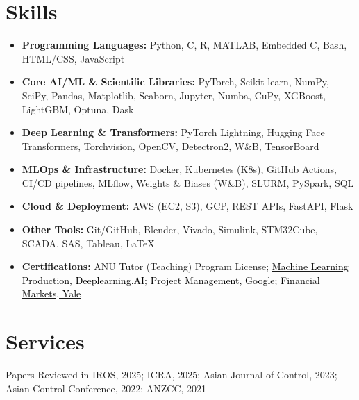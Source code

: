 \documentclass[10pt, a4paper, sans]{moderncv}
\begin{document}
%
%
%
\section*{Skills}
\begin{itemize}[leftmargin=*, itemsep=0em]
    \item \textbf{Programming Languages:} Python, C, R, MATLAB, Embedded C, Bash, HTML/CSS, JavaScript
    \item \textbf{Core AI/ML \& Scientific Libraries:} PyTorch, Scikit-learn, NumPy, SciPy, Pandas, Matplotlib, Seaborn, Jupyter, Numba, CuPy, XGBoost, LightGBM, Optuna, Dask
    \item \textbf{Deep Learning \& Transformers:} PyTorch Lightning, Hugging Face Transformers, Torchvision, OpenCV, Detectron2, W\&B, TensorBoard
    \item \textbf{MLOps \& Infrastructure:} Docker, Kubernetes (K8s), GitHub Actions, CI/CD pipelines, MLflow, Weights \& Biases (W\&B), SLURM, PySpark, SQL
    \item \textbf{Cloud \& Deployment:} AWS (EC2, S3), GCP, REST APIs, FastAPI, Flask
    \item \textbf{Other Tools:} Git/GitHub, Blender, Vivado, Simulink, STM32Cube, SCADA, SAS, Tableau, \LaTeX
    \item \textbf{Certifications:} ANU Tutor (Teaching) Program License; \href{https://coursera.org/share/8204c8b2ca3d84b7fccec7d44edaa8b7}{\textcolor{black}{Machine Learning Production, Deeplearning.AI}}; \href{https://www.coursera.org/account/accomplishments/certificate/JZCYF4MAB3CX}{\textcolor{black}{Project Management, Google}}; \href{https://www.coursera.org/account/accomplishments/verify/X6R6DZN8VGXN?utm_source=link&utm_medium=certificate&utm_content=cert_image&utm_campaign=pdf_header_button&utm_product=course}{\textcolor{black}{Financial Markets, Yale}}
\end{itemize}
\vspace{-1em}
\section*{Services}
Papers Reviewed in IROS, 2025; ICRA, 2025; Asian Journal of Control, 2023; Asian Control Conference, 2022; ANZCC, 2021
\end{document}
